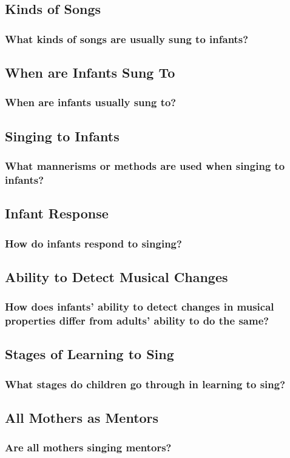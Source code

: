 \documentclass{beamer}
\begin{document}
\subsection*{Kinds of Songs}
\begin{frame}
	\frametitle{What kinds of songs are usually sung to infants?}
\end{frame}

\subsection*{When are Infants Sung To}
\begin{frame}
	\frametitle{When are infants usually sung to?}
\end{frame}

\subsection*{Singing to Infants}
\begin{frame}
	\frametitle{What mannerisms or methods are used when singing to infants?}
\end{frame}

\subsection*{Infant Response}
\begin{frame}
	\frametitle{How do infants respond to singing?}
\end{frame}

\subsection*{Ability to Detect Musical Changes}
\begin{frame}
	\frametitle{How does infants' ability to detect changes in musical properties differ from adults' ability to do the same?}
\end{frame}

\subsection*{Stages of Learning to Sing}
\begin{frame}
	\frametitle{What stages do children go through in learning to sing?}
\end{frame}

\subsection*{All Mothers as Mentors}
\begin{frame}
	\frametitle{Are all mothers singing mentors?}
\end{frame}

\end{document}
